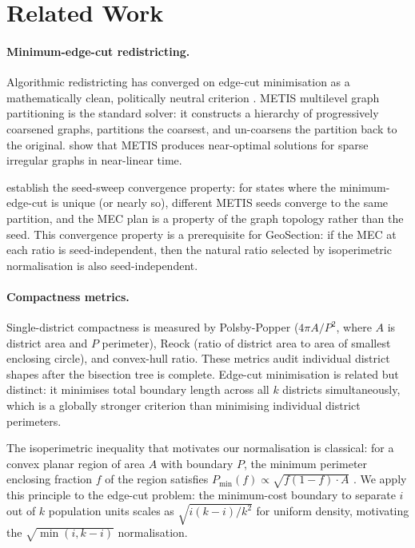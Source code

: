 \section{Related Work}
\label{sec:related}

\paragraph{Minimum-edge-cut redistricting.}
Algorithmic redistricting has converged on edge-cut minimisation as a
mathematically clean, politically neutral criterion
\citep{chikina2017,deford2019,duchin2020}.
METIS multilevel graph partitioning \citep{karypis1998} is the standard solver:
it constructs a hierarchy of progressively coarsened graphs,
partitions the coarsest, and un-coarsens the partition back to the original.
\citet{karypis1998} show that METIS produces near-optimal solutions for
sparse irregular graphs in near-linear time.

\citet{b7paper} establish the seed-sweep convergence property: for states where the
minimum-edge-cut is unique (or nearly so), different METIS seeds converge
to the same partition, and the MEC plan is a property of the graph topology
rather than the seed.
This convergence property is a prerequisite for GeoSection: if the MEC at
each ratio is seed-independent, then the natural ratio selected by
isoperimetric normalisation is also seed-independent.

\paragraph{Compactness metrics.}
Single-district compactness is measured by Polsby-Popper
\citep{polsby1991} ($4\pi A/P^2$, where $A$ is district area and $P$ perimeter),
Reock \citep{reock1961} (ratio of district area to area of smallest enclosing circle),
and convex-hull ratio.
These metrics audit individual district shapes after the bisection tree
is complete.
Edge-cut minimisation is related but distinct: it minimises total boundary
length across all $k$ districts simultaneously, which is a globally stronger
criterion than minimising individual district perimeters.

The isoperimetric inequality that motivates our normalisation is classical:
for a convex planar region of area $A$ with boundary $P$, the minimum
perimeter enclosing fraction $f$ of the region satisfies
$P_{\min}(f) \propto \sqrt{f(1-f) \cdot A}$ \citep{osserman1978}.
We apply this principle to the edge-cut problem: the minimum-cost boundary
to separate $i$ out of $k$ population units scales as $\sqrt{i(k-i)/k^2}$
for uniform density, motivating the $\sqrt{\min(i,k-i)}$ normalisation.

